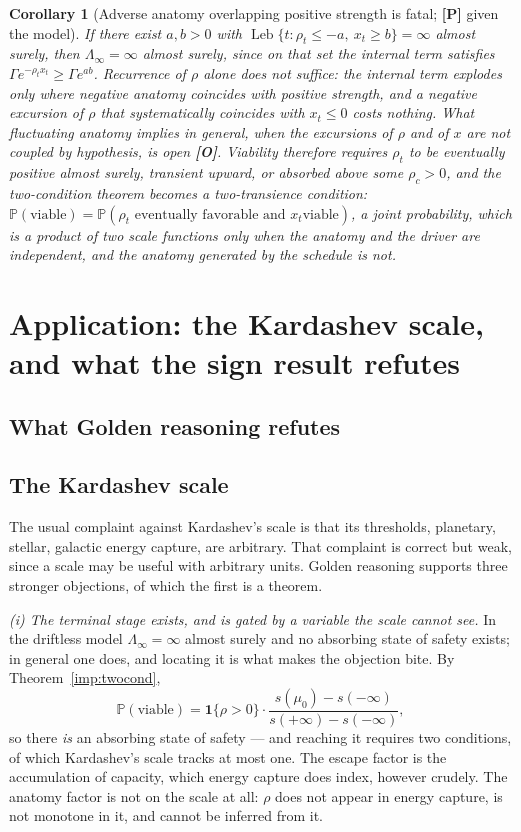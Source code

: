 \documentclass[11pt]{article}
\newcommand{\PP}{\mathbb{P}}
\DeclareMathOperator{\Leb}{Leb}
\newcommand{\one}{\mathbf{1}}
\theoremstyle{plain}
\newtheorem{corollary}[theorem]{Corollary}
\theoremstyle{definition}
\theoremstyle{remark}
\begin{document}
\begin{corollary}[Adverse anatomy overlapping positive strength is
fatal; \textbf{[P]} given the model]
\label{gr1:cor:recurrentanatomy}
If there exist $a,b>0$ with
$\Leb\{t:\rho_t\le-a,\ x_t\ge b\}=\infty$ almost surely, then
$\Lambda_\infty=\infty$ almost surely, since on that set the internal
term satisfies $\Gamma e^{-\rho_tx_t}\ge\Gamma e^{ab}$. Recurrence of
$\rho$ alone does not suffice: the internal term explodes only where
negative anatomy coincides with positive strength, and a negative
excursion of $\rho$ that systematically coincides with $x_t\le0$ costs
nothing. What fluctuating anatomy implies in general, when the
excursions of $\rho$ and of $x$ are not coupled by hypothesis, is open
\textbf{[O]}. Viability
therefore requires $\rho_t$ to be eventually positive almost surely,
transient upward, or absorbed above some $\rho_c>0$, and the
two-condition theorem becomes a \emph{two-transience} condition:
$\PP(\text{viable})=\PP(\rho_t\text{ eventually favorable and }x_t\text{
viable})$, a joint probability, which is a product of two scale
functions only when the anatomy and the driver are independent, and
the anatomy generated by the schedule is not.
\end{corollary}

\section{Application: the Kardashev scale, and what the sign result refutes}\label{sec:refutes}

\subsection{What Golden reasoning refutes}\label{gr:sub:refutes}

\subsection{The Kardashev scale}\label{gr:subsub:kardashev}

The usual complaint against Kardashev's scale \cite{Kar64} is that its
thresholds, planetary, stellar, galactic energy capture, are
arbitrary. That complaint is correct but weak, since a scale may be
useful with arbitrary units. Golden reasoning supports three stronger
objections, of which the first is a theorem.

\emph{(i) The terminal stage exists, and is gated by a variable the
scale cannot see.} In the driftless model $\Lambda_\infty=\infty$
almost surely and no absorbing state of safety exists; in general one
does, and locating it is what makes the objection bite. By
Theorem~\ref{imp:twocond},
\[
\PP(\text{viable})=\one\{\rho>0\}\cdot
\frac{s(\mu_0)-s(-\infty)}{s(+\infty)-s(-\infty)},
\]
so there \emph{is} an absorbing state of safety --- and reaching it
requires two conditions, of which Kardashev's scale tracks at most one.
The escape factor is the accumulation of capacity, which energy
capture does index, however crudely. The anatomy factor is not on the
scale at all: $\rho$ does not appear in energy capture, is not
monotone in it, and cannot be inferred from it.
\end{document}
